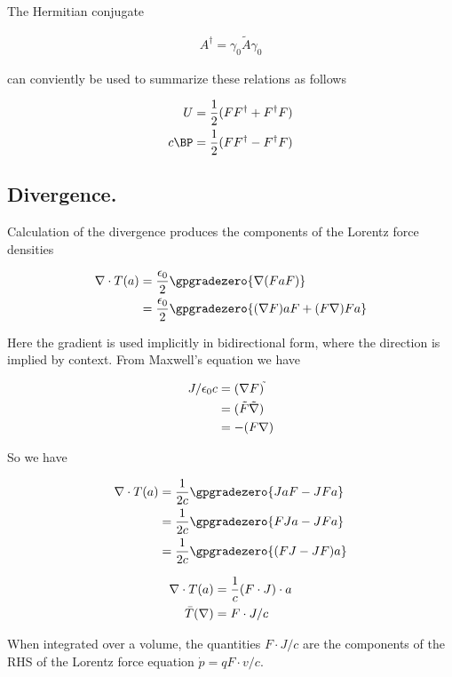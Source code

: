 \documentclass[]{eliblog}
\begin{document}
The Hermitian conjugate

\begin{align}
A^\dagger = \gamma_0 \tilde{A} \gamma_0
\end{align}

can conviently be used to summarize these relations as follows

\begin{align}
U &= \frac{1}{2}( F F^\dagger + F^\dagger F) \\
c \BP &= \frac{1}{2}( F F^\dagger - F^\dagger F)
\end{align}

\subsection{ Divergence. }

Calculation of the divergence produces the components of the Lorentz force densities

\begin{align*}
\grad \cdot T(a)
&= \frac{\epsilon_0}{2} \gpgradezero{ \grad (F a F) } \\
&= \frac{\epsilon_0}{2} \gpgradezero{ (\grad F) a F + (F \grad) F a } \\
\end{align*}

Here the gradient is used implicitly in bidirectional form, where the direction is implied by context.
From Maxwell's equation we have

\begin{align*}
J/\epsilon_0 c
&= (\nabla F)^{\tilde{}} \\
&= (\tilde{F} \tilde{\nabla}) \\
&= -(F \nabla)
\end{align*}

So we have

\begin{align*}
\grad \cdot T(a)
&= \frac{1}{2c} \gpgradezero{ J a F - J F a } \\
&= \frac{1}{2c} \gpgradezero{ F J a - J F a } \\
&= \frac{1}{2c} \gpgradezero{ (F J - J F) a } \\
\end{align*}

\begin{align}
\nabla \cdot T(a) &= \frac{1}{c} (F \cdot J) \cdot a \\
\bar{T}(\nabla) &= F \cdot J/c
\end{align}

When integrated over a volume, the quantities $F \cdot J/c$ are the components of the RHS of the Lorentz
force equation $\dot{p} = q F \cdot v/c$.



\end{document}
